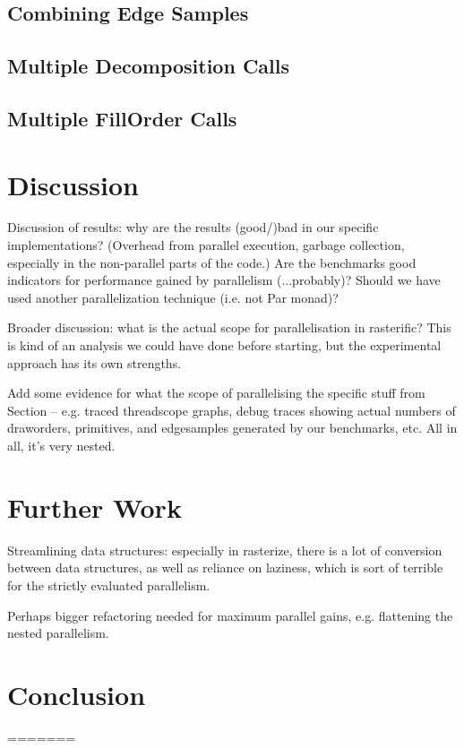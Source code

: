 \documentclass[12pt, a4paper]{article}
\begin{document}
\subsection{Combining Edge Samples}

\subsection{Multiple Decomposition Calls}

\subsection{Multiple FillOrder Calls}

\section{Discussion}\label{discussion}

Discussion of results: why are the results (good/)bad in our specific implementations? (Overhead from parallel execution, garbage collection, especially in the non-parallel parts of the code.)
Are the benchmarks good indicators for performance gained by parallelism (...probably)? Should we have used another parallelization technique (i.e. not Par monad)?

Broader discussion: what is the actual scope for parallelisation in rasterific? This is kind of an analysis we could have done before starting, but the experimental approach has its own strengths.

Add some evidence for what the scope of parallelising the specific stuff from Section \label{experiments} -- e.g. traced threadscope graphs, debug traces showing actual numbers of draworders, primitives, and edgesamples generated by our benchmarks, etc. All in all, it's very nested.

\section{Further Work}\label{furtherwork}

Streamlining data structures: especially in rasterize, there is a lot of conversion between data structures, as well as reliance on laziness, which is sort of terrible for the strictly evaluated parallelism.

Perhaps bigger refactoring needed for maximum parallel gains, e.g. flattening the nested parallelism.

\section{Conclusion}
=======
\clearpage
\appendix
\end{document}
